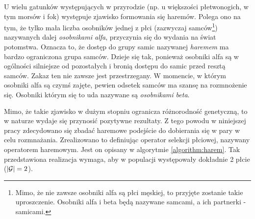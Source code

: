 \documentclass[./FM_mgr.tex]{subfiles}
\begin{document}
U wielu gatunków występujących w przyrodzie (np. u większości płetwonogich\cite{pletwonogiMajaHaremy}, w tym morsów i fok) występuje zjawisko formowania się haremów.
Polega ono na tym, że tylko mała liczba osobników jednej z płci (zazwyczaj samców\footnote{
	Mimo, że nie zawsze osobniki alfa są płci męskiej, to przyjęte zostanie takie uproszczenie. 
	Osobniki alfa i beta będą nazywane samcami, a ich partnerki - samicami.
}) nazywanych dalej \emph{osobnikami alfa}, przyczynia się do wydania na świat potomstwa.
Oznacza to, że dostęp do grupy samic nazywanej \emph{haremem} ma bardzo ograniczona grupa samców.
Dzieje się tak, ponieważ osobniki alfa są w ogólności silniejsze od pozostałych i bronią dostępu do samic przed resztą samców.
Zakaz ten nie zawsze jest przestrzegany.
W momencie, w którym osobniki alfa są czymś zajęte, pewien odsetek samców ma szansę na rozmnożenie się.
Osobniki którym się to uda nazywane są \emph{osobnikami beta}.

Mimo, że takie zjawisko w dużym stopniu ogranicza różnorodność genetyczną, to w naturze wydaje się przynosić pozytywne rezultaty.
Z tego powodu w niniejszej pracy zdecydowano się zbadać haremowe podejście do dobierania się w pary w celu rozmnażania.
Zrealizowano to definiując operator selekcji płciowej, nazywany operatorem haremowym. Jest on opisany w algorytmie \ref{algorithm:harem}. 
Tak przedstawiona realizacja wymaga, aby w populacji występowały dokładnie 2 płcie ($|\mathcal{G}| = 2$).
\end{document}
